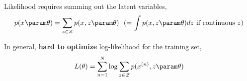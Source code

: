 \begin{frame}
Likelihood requires summing out the latent variables,
    \[p(x^{} \param \theta) = \sum_{z \in \mathcal{Z}} p(x^{}, z \param \theta)\ \  \text{(= $\int p(x, z \param \theta) dz$ if continuous $z$)} \]
    \pause
    
 In general, \textbf{hard to optimize} log-likelihood for the training set,
\[  L(\theta) =  \sum_{n=1}^N \log \sum_{z \in \mathcal{Z}} p(x^{(n)} , z \param \theta)  \]
\begin{center}
\end{center}

\end{frame}





